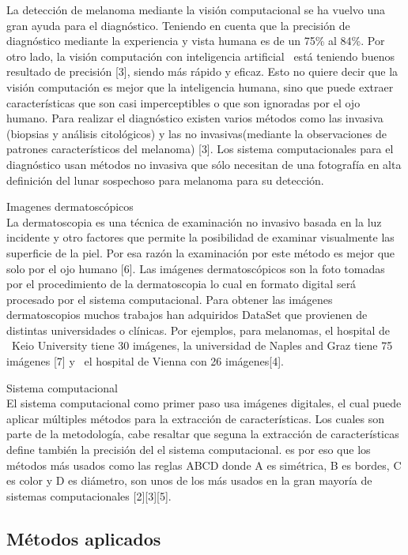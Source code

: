\documentclass[a4paper]{article}
\begin{document}
La detección de melanoma mediante la visión computacional se ha vuelvo una gran ayuda para el diagnóstico. Teniendo en cuenta que la precisión de diagnóstico mediante la experiencia y vista humana es de un 75\% al 84\%. Por otro lado, la visión computación con inteligencia artificial  está teniendo buenos resultado de precisión [3], siendo más rápido y eficaz. Esto no quiere decir que la visión computación es mejor que la inteligencia humana, sino que puede extraer características que son casi imperceptibles o que son ignoradas por el ojo humano.
Para realizar el diagnóstico existen varios métodos como las invasiva (biopsias y análisis citológicos) y las no invasivas(mediante la observaciones de patrones característicos del melanoma) [3]. Los sistema computacionales para el diagnóstico usan métodos no invasiva que sólo necesitan de una fotografía en alta definición del lunar sospechoso para melanoma para su detección.

Imagenes dermatoscópicos\\
La dermatoscopia es una técnica de examinación no invasivo basada en la luz incidente y otro factores que permite la posibilidad de examinar visualmente las superficie de la piel. Por esa razón la examinación por este método es mejor que solo por el ojo humano [6].
Las imágenes dermatoscópicos son la foto tomadas por el procedimiento de la dermatoscopia lo cual en formato digital será procesado por el sistema computacional.
Para obtener las imágenes dermatoscopios muchos trabajos han adquiridos DataSet que provienen de distintas universidades o clínicas. Por ejemplos, para melanomas, el hospital de  Keio University tiene 30 imágenes, la universidad de Naples and Graz tiene 75 imágenes [7] y  el hospital de Vienna con 26 imágenes[4].

Sistema computacional\\
El sistema computacional como primer paso usa imágenes digitales, el cual puede aplicar múltiples métodos para la extracción de características. Los cuales son parte de la metodología, cabe resaltar que seguna la extracción de características define también la precisión del el sistema computacional. es por eso que los métodos más usados como las reglas ABCD donde A es simétrica, B es bordes, C es color y D es diámetro, son unos de los más usados en la gran mayoría de sistemas computacionales [2][3][5]. 


\subsection{Métodos aplicados}
\end{document}
